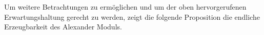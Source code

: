 


     Um weitere Betrachtungen zu ermöglichen und um der oben hervorgerufenen Erwartungshaltung gerecht zu werden, zeigt die folgende Proposition die endliche Erzeugbarkeit des Alexander Moduls.

